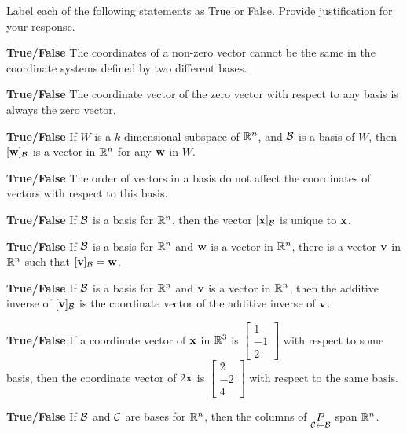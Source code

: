 \item Label each of the following statements as True or False. Provide justification for your response.
\ba
\item \textbf{True/False} The coordinates of a non-zero vector cannot be the same in the coordinate systems defined by two different bases.

\item \textbf{True/False} The coordinate vector of the zero vector with respect to any basis is always the zero vector.

\item \textbf{True/False} If $W$ is a $k$ dimensional subspace of $\mathbb{R}^n$, and $\mathcal{B}$ is a basis of $W$, then $[\mathbf{w}]_{\mathcal{B}}$ is a vector in $\mathbb{R}^n$ for any $\mathbf{w}$ in $W$.

\item \textbf{True/False} The order of vectors in a basis do not affect the coordinates of vectors with respect to this basis.

\item \textbf{True/False} If $\mathcal{B}$ is a basis for $\mathbb{R}^n$, then the vector $[\mathbf{x}]_{\mathcal{B}}$ is unique to $\mathbf{x}$. 

\item \textbf{True/False}  If $\mathcal{B}$ is a basis for $\mathbb{R}^n$ and $\mathbf{w}$ is a vector in $\mathbb{R}^n$, there is a vector $\mathbf{v}$ in $\mathbb{R}^n$ such that $[\mathbf{v}]_{\mathcal{B}} = \mathbf{w}$. 

\item \textbf{True/False}  If $\mathcal{B}$ is a basis for $\mathbb{R}^n$ and $\mathbf{v}$ is a vector in $\mathbb{R}^n$, then the additive inverse of $[\mathbf{v}]_{\mathcal{B}}$ is the coordinate vector of the additive inverse of $\mathbf{v}$. 

\item \textbf{True/False} If a coordinate vector of $\mathbf{x}$ in $\mathbb{R}^3$ is $\left[ \begin{array}{r} 1\\-1\\2 \end{array} \right]$ with respect to some basis, then the coordinate vector of $2\mathbf{x}$ is $\left[ \begin{array}{r} 2\\-2\\4 \end{array} \right]$ with respect to the same basis.

\item \textbf{True/False} If $\mathcal{B}$ and $\mathcal{C}$ are bases for $\mathbb{R}^n$, then the columns of $\underset{\mathcal{C} \leftarrow \mathcal{B}}{P}$ span $\mathbb{R}^n$. 

